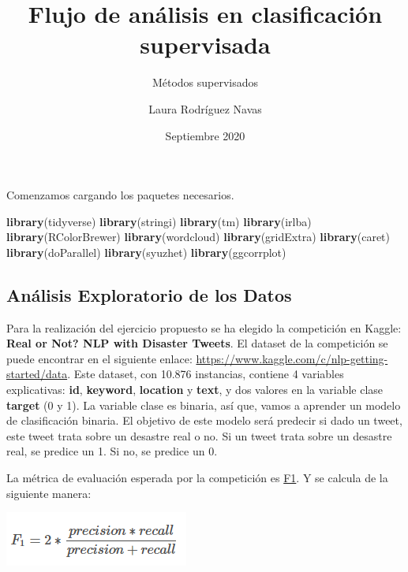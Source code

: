 \documentclass[
]{article}
\title{Flujo de análisis en clasificación supervisada}
\subtitle{Métodos supervisados}
\author{Laura Rodríguez Navas}
\date{Septiembre 2020}
\newenvironment{Shaded}{\begin{snugshade}}{\end{snugshade}}
\newcommand{\KeywordTok}[1]{\textcolor[rgb]{0.13,0.29,0.53}{\textbf{#1}}}
\newcommand{\NormalTok}[1]{#1}
\begin{document}
\maketitle

{
\setcounter{tocdepth}{2}
\tableofcontents
}
Comenzamos cargando los paquetes necesarios.

\begin{Shaded}
\begin{Highlighting}[]
\KeywordTok{library}\NormalTok{(tidyverse)}
\KeywordTok{library}\NormalTok{(stringi)}
\KeywordTok{library}\NormalTok{(tm)}
\KeywordTok{library}\NormalTok{(irlba)}
\KeywordTok{library}\NormalTok{(RColorBrewer)}
\KeywordTok{library}\NormalTok{(wordcloud)}
\KeywordTok{library}\NormalTok{(gridExtra)}
\KeywordTok{library}\NormalTok{(caret)}
\KeywordTok{library}\NormalTok{(doParallel)}
\KeywordTok{library}\NormalTok{(syuzhet)}
\KeywordTok{library}\NormalTok{(ggcorrplot)}
\end{Highlighting}
\end{Shaded}

\hypertarget{anuxe1lisis-exploratorio-de-los-datos}{%
\subsection{Análisis Exploratorio de los
Datos}\label{anuxe1lisis-exploratorio-de-los-datos}}

Para la realización del ejercicio propuesto se ha elegido la competición
en Kaggle: \textbf{Real or Not? NLP with Disaster Tweets}. El dataset de
la competición se puede encontrar en el siguiente enlace:
\url{https://www.kaggle.com/c/nlp-getting-started/data}. Este dataset,
con 10.876 instancias, contiene 4 variables explicativas: \textbf{id},
\textbf{keyword}, \textbf{location} y \textbf{text}, y dos valores en la
variable clase \textbf{target} (0 y 1). La variable clase es binaria,
así que, vamos a aprender un modelo de clasificación binaria. El
objetivo de este modelo será predecir si dado un tweet, este tweet trata
sobre un desastre real o no. Si un tweet trata sobre un desastre real,
se predice un 1. Si no, se predice un 0.

La métrica de evaluación esperada por la competición es
\href{https://www.kaggle.com/c/nlp-getting-started/overview/evaluation}{F1}.
Y se calcula de la siguiente manera:

\begin{center}\includegraphics[width=0.3\linewidth]{F1_score} \end{center}
\end{document}
